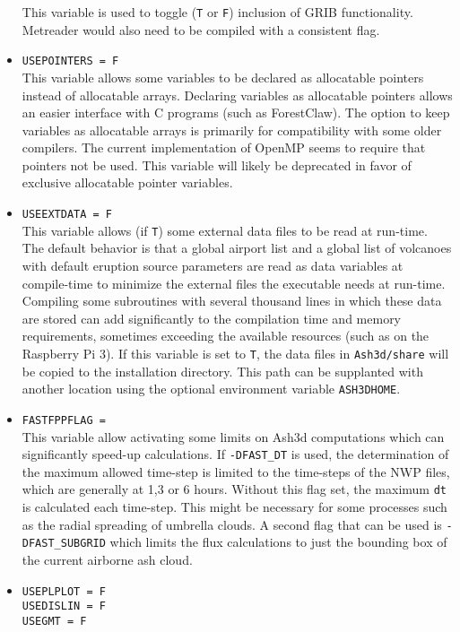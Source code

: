 \begin{itemize}
This variable is used to toggle (\texttt{T} or \texttt{F}) inclusion of GRIB
functionality.  Metreader would also need to be compiled with a consistent flag.
 \item \texttt{USEPOINTERS = F}\\
This variable allows some variables to be declared as allocatable pointers instead
of allocatable arrays.  Declaring variables as allocatable pointers allows an easier
interface with C programs (such as ForestClaw).  The option to keep variables as
allocatable arrays is primarily for compatibility with some older compilers.  The
current implementation of OpenMP seems to require that pointers not be used.
This variable
will likely be deprecated in favor of exclusive allocatable pointer variables.
 \item \texttt{USEEXTDATA = F}\\
This variable allows (if \texttt{T}) some external data files to be read at run-time.
The default behavior is that a global airport list and a global list of volcanoes with
default eruption source parameters are read as data variables at compile-time
to minimize the external files the executable needs at run-time.  Compiling
some subroutines with several thousand lines in which these data are stored can add
significantly to the compilation time and memory requirements, sometimes exceeding
the available resources (such as on the Raspberry Pi 3).  If this variable is set to
\texttt{T}, the data files in \texttt{Ash3d/share} will be copied to the installation
directory.  This path can be supplanted with another location using the optional
environment variable \texttt{ASH3DHOME}.
 \item \texttt{FASTFPPFLAG = }\\
This variable allow activating some limits on Ash3d computations which can significantly
speed-up calculations.  If \texttt{-DFAST\_DT} is used, the determination of the
maximum allowed time-step is limited to the time-steps of the NWP files, which are
generally at 1,3 or 6 hours.  Without this flag set, the maximum \texttt{dt} is
calculated each time-step.  This might be necessary for some processes such as
the radial spreading of umbrella clouds.  A second flag that can be used is
\texttt{-DFAST\_SUBGRID} which limits the flux calculations to just the bounding
box of the current airborne ash cloud.
 \item \texttt{USEPLPLOT = F}\\
 \texttt{USEDISLIN = F}\\
 \texttt{USEGMT = F}\\

\end{itemize}
